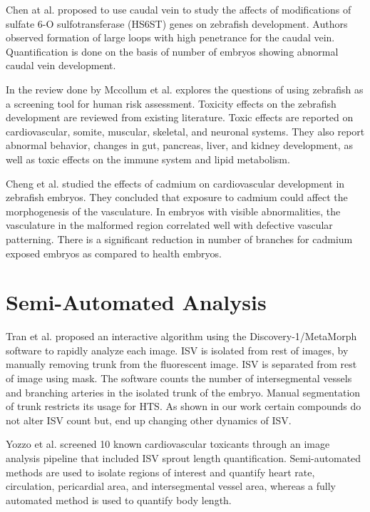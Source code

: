 Chen at al. \cite{Chen05} proposed to use caudal vein to study the affects of modifications of sulfate 6-O sulfotransferase (HS6ST) genes on zebrafish development. Authors observed formation of large loops with high penetrance for the caudal vein. Quantification is done on the basis of number of embryos showing abnormal caudal vein development. 

In the review done by Mccollum et al. \cite{mccollum2011} explores the questions of using zebrafish as a screening tool for human risk assessment. Toxicity effects on the zebrafish development are reviewed from existing literature. Toxic effects are reported on cardiovascular, somite, muscular, skeletal, and neuronal systems. They also report abnormal behavior, changes in gut, pancreas, liver, and kidney development, as well as toxic effects on the immune system and lipid metabolism. 

Cheng et al. \cite{cheng2001} studied the effects of cadmium on cardiovascular development in zebrafish embryos. They concluded that exposure to cadmium could affect the morphogenesis of the vasculature. In embryos with visible abnormalities, the vasculature in the malformed region correlated well with defective vascular patterning. There is a significant reduction in number of branches for cadmium exposed embryos as compared to health embryos.  


\section{Semi-Automated Analysis} \label{sec:RelatedWorkSemi}

Tran et al. \cite{Tran07} proposed an interactive algorithm using the Discovery-1/MetaMorph software to rapidly analyze each image. ISV is isolated from rest of images, by manually removing trunk from the fluorescent image. ISV is separated from rest of image using mask. The software counts the number of intersegmental vessels and branching arteries in the isolated trunk of the embryo. Manual segmentation of trunk restricts its usage for HTS. As shown in our work certain compounds do not alter ISV count but, end up changing other dynamics of ISV.

Yozzo et al. \cite{Yozzo13} screened 10 known cardiovascular toxicants through an image analysis pipeline that included ISV sprout length quantification. Semi-automated methods are used to isolate regions of interest and quantify heart rate, circulation, pericardial area, and intersegmental vessel area, whereas a fully automated method is used to quantify body length.

